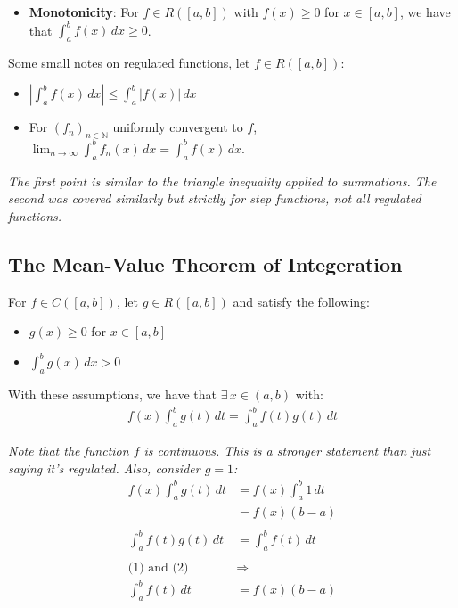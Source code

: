 \documentclass[a4paper, 12pt, twoside]{article}
\begin{document}
\begin{itemize}
      \item \textbf{Monotonicity}: For $f \in R([a,b])$ with $f(x) \geq 0$
            for $x \in [a, b]$, we have that $\int_a^b f(x)\,dx \geq 0$.
\end{itemize}

Some small notes on regulated functions, let $f \in R([a, b])$:

\begin{itemize}
      \item $|\int_a^b f(x) \, dx| \leq \int_a^b |f(x)| \, dx$
      \item For $(f_n)_{n\in\mathbb{N}}$ uniformly convergent to $f$,
            $\lim_{n\to\infty}\int_a^b f_n(x) \, dx = \int_a^b f(x) \, dx$.
\end{itemize}

\textit{The first point is similar to the triangle inequality applied to
      summations. The second was covered similarly but strictly for step functions,
      not all regulated functions.}

\newpage

\subsection{The Mean-Value Theorem of Integeration}

For $f \in C([a,b])$, let $g \in R([a, b])$ and satisfy the following:

\begin{itemize}
      \item $g(x) \geq 0$ for $x \in [a, b]$
      \item $\int_a^b g(x) \, dx > 0$
\end{itemize}

With these assumptions, we have that $\exists\, x \in (a, b)$ with:
\begin{align*}
      f(x) \int_a^b g(t) \, dt = \int_a^b f(t)g(t) \, dt
\end{align*}

\textit{Note that the function $f$ is continuous. This is a stronger
      statement than just saying it's regulated. Also, consider $g = 1$:}
\begin{align*}
      f(x) \int_a^b g(t) \, dt & = f(x) \int_a^b 1 \, dt \tag{1} \\
                               & = f(x) (b-a)                    \\
      \\
      \int_a^b f(t)g(t) \, dt  & = \int_a^b f(t) \, dt \tag{2}   \\
      \\
      \text{(1) and (2) }      & \Rightarrow                     \\
      \int_a^b f(t) \, dt      & = f(x)(b - a)
\end{align*}
\end{document}
